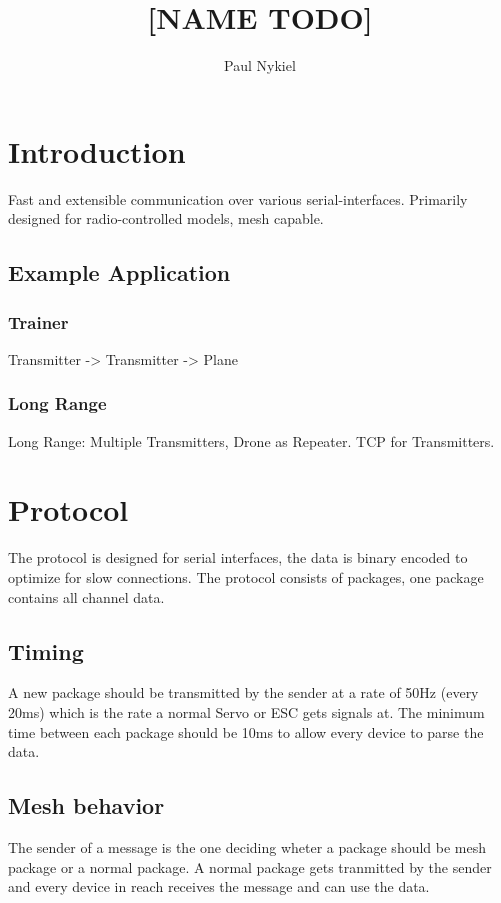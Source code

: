 \documentclass{report}
\title{[NAME TODO]}
\author{Paul Nykiel}
\begin{document}
\maketitle
\tableofcontents

\pagebreak

\chapter{Introduction}
  Fast and extensible communication over various serial-interfaces. Primarily
  designed for radio-controlled models, mesh capable.

\section{Example Application}
\subsection{Trainer}
Transmitter -> Transmitter -> Plane
\subsection{Long Range}
  Long Range: Multiple Transmitters, Drone as Repeater. TCP for Transmitters.

\chapter{Protocol}
  The protocol is designed for serial interfaces, the data is binary encoded to
  optimize for slow connections. The protocol consists of packages, one package
  contains all channel data.

  \section{Timing}
    A new package should be transmitted by the sender at a rate of 50Hz (every
    20ms) which is the rate a normal Servo or ESC gets signals at. The minimum
    time between each package should be 10ms to allow every device to parse the
    data.

  \section{Mesh behavior}
    The sender of a message is the one deciding wheter a package should be mesh
    package or a normal package. A normal package gets tranmitted by the sender
    and every device in reach receives the message and can use the data.
\end{document}
